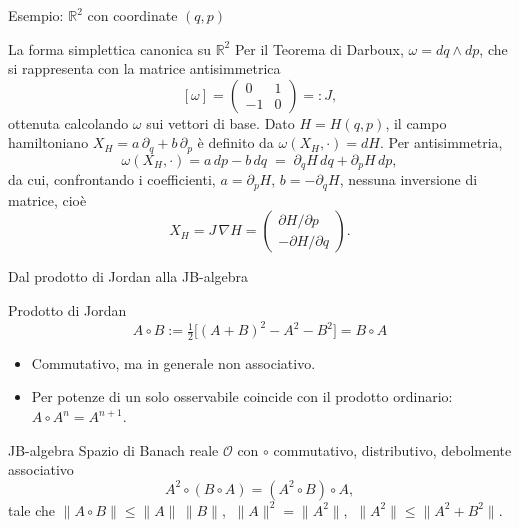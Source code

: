 \documentclass[aspectratio=169,11pt]{beamer}
\begin{document}
\begin{frame}{Esempio: $\mathbb{R}^2$ con coordinate $(q,p)$}
	\begin{exampleblock}{La forma simplettica canonica su $\mathbb{R}^2$}
		Per il Teorema di Darboux, $\omega = dq \wedge dp$, che si rappresenta con la matrice antisimmetrica
		\[
		[\omega] = \begin{pmatrix} 0 & 1 \\ -1 & 0 \end{pmatrix} =: J,
		\]
		ottenuta calcolando $\omega$ sui vettori di base. Dato $H=H(q,p)$, il campo hamiltoniano $X_H = a\,\partial_q + b\,\partial_p$ è definito da $\omega(X_H,\cdot) = dH$. Per antisimmetria,
		\[
		\omega(X_H,\cdot) = a\,dp - b\,dq \;=\; \partial_q H\, dq + \partial_p H\, dp,
		\]
		da cui, confrontando i coefficienti, $a = \partial_p H$, $b = -\partial_q H$, nessuna inversione di matrice, cioè
		\[
		X_H = J\,\nabla H = \begin{pmatrix} \partial H/\partial p \\ -\partial H/\partial q \end{pmatrix}.
		\]
	\end{exampleblock}
\end{frame}


\begin{frame}{Dal prodotto di Jordan alla JB-algebra}
	\begin{block}{Prodotto di Jordan}
		\[
		A \circ B := \tfrac12\big[(A+B)^2 - A^2 - B^2\big] = B \circ A
		\]
	\end{block}
	\begin{itemize}
		\item Commutativo, ma in generale \alert{non associativo}.
		\item Per potenze di un solo osservabile coincide con il prodotto ordinario: $A \circ A^n = A^{n+1}$.
	\end{itemize}
	
	\begin{block}{JB-algebra}
		Spazio di Banach reale $\mathcal O$ con $\circ$ commutativo, distributivo, debolmente associativo
		\[
		A^2 \circ (B \circ A) = (A^2 \circ B) \circ A,
		\]
		tale che $\|A\circ B\|\le \|A\|\,\|B\|$, $\ \|A\|^2 = \|A^2\|$, $\ \|A^2\| \le \|A^2+B^2\|$.
	\end{block}
\end{frame}
\end{document}
